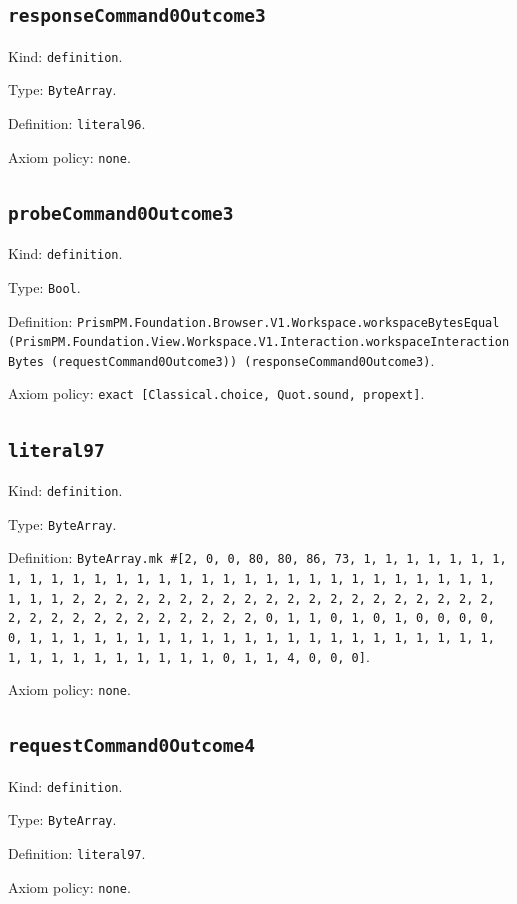 \documentclass[11pt]{article}
\begin{document}
\subsection*{\texttt{responseCommand0Outcome3}}
\noindent Kind: \texttt{definition}.\par
\noindent Type: \texttt{ByteArray}.\par
\noindent Definition: \texttt{literal96}.\par
\noindent Axiom policy: \texttt{none}.\par
\subsection*{\texttt{probeCommand0Outcome3}}
\noindent Kind: \texttt{definition}.\par
\noindent Type: \texttt{Bool}.\par
\noindent Definition: \texttt{PrismPM.Foundation.Browser.V1.Workspace.workspaceBytesEqual (PrismPM.Foundation.View.Workspace.V1.Interaction.workspaceInteractionBytes (requestCommand0Outcome3)) (responseCommand0Outcome3)}.\par
\noindent Axiom policy: \texttt{exact [Classical.choice, Quot.sound, propext]}.\par
\subsection*{\texttt{literal97}}
\noindent Kind: \texttt{definition}.\par
\noindent Type: \texttt{ByteArray}.\par
\noindent Definition: \texttt{ByteArray.mk \#[2, 0, 0, 80, 80, 86, 73, 1, 1, 1, 1, 1, 1, 1, 1, 1, 1, 1, 1, 1, 1, 1, 1, 1, 1, 1, 1, 1, 1, 1, 1, 1, 1, 1, 1, 1, 1, 1, 1, 1, 2, 2, 2, 2, 2, 2, 2, 2, 2, 2, 2, 2, 2, 2, 2, 2, 2, 2, 2, 2, 2, 2, 2, 2, 2, 2, 2, 2, 2, 2, 2, 2, 0, 1, 1, 0, 1, 0, 1, 0, 0, 0, 0, 0, 1, 1, 1, 1, 1, 1, 1, 1, 1, 1, 1, 1, 1, 1, 1, 1, 1, 1, 1, 1, 1, 1, 1, 1, 1, 1, 1, 1, 1, 1, 1, 1, 0, 1, 1, 4, 0, 0, 0]}.\par
\noindent Axiom policy: \texttt{none}.\par
\subsection*{\texttt{requestCommand0Outcome4}}
\noindent Kind: \texttt{definition}.\par
\noindent Type: \texttt{ByteArray}.\par
\noindent Definition: \texttt{literal97}.\par
\noindent Axiom policy: \texttt{none}.\par
\end{document}

